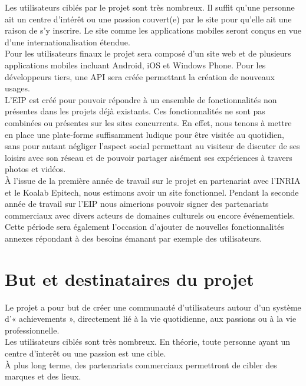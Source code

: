 \documentclass{life-fr}
\begin{document}
Les utilisateurs ciblés par le projet sont très nombreux. Il suffit qu'une personne ait un centre d'intérêt ou une passion couvert(e) par le site pour qu'elle ait une raison de s'y inscrire. Le site comme les applications mobiles seront conçus en vue d'une internationalisation étendue.\\

Pour les utilisateurs finaux le projet sera composé d'un site web et de plusieurs applications mobiles incluant Android, iOS et Windows Phone. Pour les développeurs tiers, une API sera créée permettant la création de nouveaux usages.\\

L'EIP est créé pour pouvoir répondre à un ensemble de fonctionnalités non présentes dans les projets déjà existants. Ces fonctionnalités ne sont pas combinées ou présentes sur les sites concurrents. En effet, nous tenons à mettre en place une plate-forme suffisamment ludique pour être visitée au quotidien, sans pour autant négliger l’aspect social permettant au visiteur de discuter de ses loisirs avec son réseau et de pouvoir partager aisément ses expériences à travers photos et vidéos.\\

À l'issue de la première année de travail sur le projet en partenariat avec l'INRIA et le Koalab Epitech, nous estimons avoir un site fonctionnel. Pendant la seconde année de travail sur l'EIP nous aimerions pouvoir signer des partenariats commerciaux avec divers acteurs de domaines culturels ou encore événementiels. Cette période sera également l'occasion d'ajouter de nouvelles fonctionnalités annexes répondant à des besoins émanant par exemple des utilisateurs.

\section{But et destinataires du projet}

Le projet a pour but de créer une communauté d'utilisateurs autour d'un système d'« achievements », directement lié à la vie quotidienne, aux passions ou à la vie professionnelle.\\

Les utilisateurs ciblés sont très nombreux. En théorie, toute personne ayant un centre d'interêt ou une passion est une cible.\\

À plus long terme, des partenariats commerciaux permettront de cibler des marques et des lieux.\\
\end{document}
